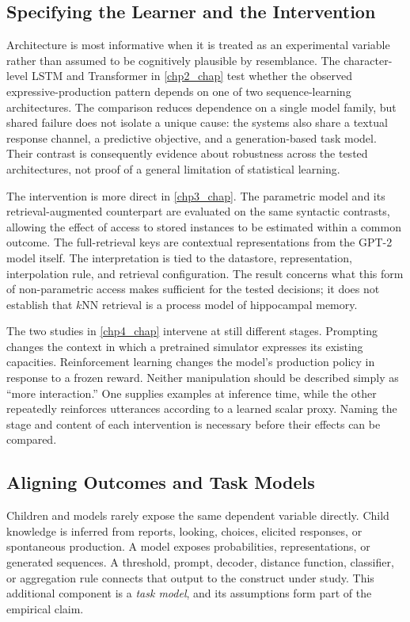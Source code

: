 \subsection{Specifying the Learner and the Intervention}
\label{sec:gd_calibration_learner}

Architecture is most informative when it is treated as an experimental variable rather than assumed to be cognitively plausible by resemblance. The character-level LSTM and Transformer in \cref{chp2_chap} test whether the observed expressive-production pattern depends on one of two sequence-learning architectures. The comparison reduces dependence on a single model family, but shared failure does not isolate a unique cause: the systems also share a textual response channel, a predictive objective, and a generation-based task model. Their contrast is consequently evidence about robustness across the tested architectures, not proof of a general limitation of statistical learning.

The intervention is more direct in \cref{chp3_chap}. The parametric model and its retrieval-augmented counterpart are evaluated on the same syntactic contrasts, allowing the effect of access to stored instances to be estimated within a common outcome. The full-retrieval keys are contextual representations from the GPT-2 model itself. The interpretation is tied to the datastore, representation, interpolation rule, and retrieval configuration. The result concerns what this form of non-parametric access makes sufficient for the tested decisions; it does not establish that $k$NN retrieval is a process model of hippocampal memory.

The two studies in \cref{chp4_chap} intervene at still different stages. Prompting changes the context in which a pretrained simulator expresses its existing capacities. Reinforcement learning changes the model's production policy in response to a frozen reward. Neither manipulation should be described simply as ``more interaction.'' One supplies examples at inference time, while the other repeatedly reinforces utterances according to a learned scalar proxy. Naming the stage and content of each intervention is necessary before their effects can be compared.

\subsection{Aligning Outcomes and Task Models}
\label{sec:gd_calibration_outcome}

Children and models rarely expose the same dependent variable directly. Child knowledge is inferred from reports, looking, choices, elicited responses, or spontaneous production. A model exposes probabilities, representations, or generated sequences. A threshold, prompt, decoder, distance function, classifier, or aggregation rule connects that output to the construct under study. This additional component is a \emph{task model}, and its assumptions form part of the empirical claim.


